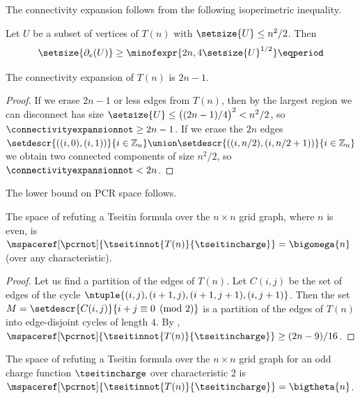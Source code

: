 The connectivity expansion follows from the following isoperimetric inequality.
\begin{theorem}
  \label{th:isoperimetric-grid}
  Let $U$ be a subset of vertices of $T(n)$ with $\setsize{U}\leq n^2/2$. Then
  \begin{equation*}
    \setsize{\partial_e(U)}\geq\minofexpr{2n,4\setsize{U}^{1/2}} \eqperiod
  \end{equation*}
\end{theorem}
\begin{corollary}
  The connectivity expansion of $T(n)$ is $2n-1$.
\end{corollary}
\begin{proof}
  If we erase $2n-1$ or less edges from $T(n)$, then by  the largest region we can disconnect has size $\setsize{U}\leq\bigl((2n-1)/4\bigr)^2<n^2/2$, so $\connectivityexpansionnot\geq 2n-1$. If we erase the $2n$ edges $\setdescr{((i, 0), (i, 1))}{i \in \mathbb{Z}_n} \union \setdescr{((i, n / 2), (i, n / 2 + 1))}{i \in \mathbb{Z}_n}$ we obtain two connected components of size $n^2/2$, so $\connectivityexpansionnot<2n$.
\end{proof}

The lower bound on PCR space follows.
\begin{corollary}
  \label{cor:grid-space-lower-bound}
  The space of refuting a Tseitin formula over the $n\times n$ grid
  graph, where $n$ is even, is
  $\mspaceref[\pcrnot]{\tseitinnot{T(n)}{\tseitincharge}}=\bigomega{n}$
  (over any characteristic).
\end{corollary}
\begin{proof}
  Let us find a partition of the edges of $T(n)$. Let $C(i,j)$ be the set of edges of the cycle $\ntuple{(i,j),(i+1,j),(i+1,j+1),(i,j+1)}$. Then the set $M=\setdescr{C(i,j)}{i+j \equiv 0 \pmod{2}}$ is a partition of the edges of $T(n)$ into edge-disjoint cycles of length $4$. By , $\mspaceref[\pcrnot]{\tseitinnot{T(n)}{\tseitincharge}}\geq (2n-9)/16$.
\end{proof}

\begin{theorem} \label{th:grid-space-tight-bound}
  The space of refuting a Tseitin formula over the $n\times n$ grid graph for an odd charge function $\tseitincharge$ over characteristic $2$ is $\mspaceref[\pcrnot]{\tseitinnot{T(n)}{\tseitincharge}}=\bigtheta{n}$.
\end{theorem}

